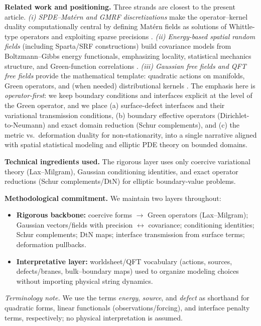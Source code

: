 \documentclass[11pt]{article}
\theoremstyle{definition}
\theoremstyle{plain}
\theoremstyle{remark}
\begin{document}
\medskip
\noindent\textbf{Related work and positioning.}
Three strands are closest to the present article.
\emph{(i) SPDE--Mat\'ern and GMRF discretizations} make the operator--kernel duality computationally central by defining Mat\'ern fields as solutions of Whittle-type operators and exploiting sparse precisions \citep{Whittle1954,Whittle1967,LindgrenRueLindstrom2011,LindgrenBolinRue2022}.
\emph{(ii) Energy-based spatial random fields} (including Sparta/SRF constructions) build covariance models from Boltzmann--Gibbs energy functionals, emphasizing locality, statistical mechanics structure, and Green-function correlations \citep{HristopulosElogne2007,Hristopulos2020,AllardHristopulosOpitz2021,Hristopulos2022BGSPH}.
\emph{(iii) Gaussian free fields and QFT free fields} provide the mathematical template: quadratic actions on manifolds, Green operators, and (when needed) distributional kernels \citep{Cardy1996,Polyakov1987,DiFrancescoMathieuSenechal1997,Polchinski1998}.
The emphasis here is \emph{operator-first}: we keep boundary conditions and interfaces explicit at the level of the Green operator, and we place (a) surface-defect interfaces and their variational transmission conditions, (b) boundary effective operators (Dirichlet-to-Neumann) and exact domain reduction (Schur complements), and (c) the metric vs.\ deformation duality for non-stationarity, into a single narrative aligned with spatial statistical modeling and elliptic PDE theory on bounded domains.


\medskip
\noindent\textbf{Technical ingredients used.}
The rigorous layer uses only coercive variational theory (Lax--Milgram), Gaussian conditioning identities,
and exact operator reductions (Schur complements/DtN) for elliptic boundary-value problems.

\medskip
\noindent\textbf{Methodological commitment.}
We maintain two layers throughout:
\begin{itemize}[leftmargin=2em]
\item \textbf{Rigorous backbone:} coercive forms $\to$ Green operators (Lax--Milgram); Gaussian vectors/fields with precision $\leftrightarrow$ covariance; conditioning identities; Schur complements; DtN maps; interface transmission from surface terms; deformation pullbacks.
\item \textbf{Interpretative layer:} worldsheet/QFT vocabulary (actions, sources, defects/branes, bulk--boundary maps) used to organize modeling choices without importing physical string dynamics.
\end{itemize} 
\noindent\emph{Terminology note.} We use the terms \emph{energy}, \emph{source}, and \emph{defect} as shorthand for quadratic forms, linear functionals (observations/forcing), and interface penalty terms, respectively; no physical interpretation is assumed.
\end{document}
